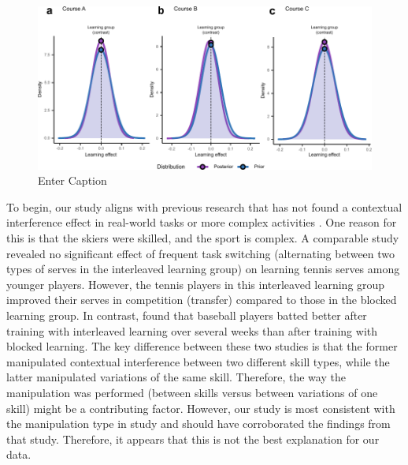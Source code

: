 \begin{figure}
    \centering
    \includegraphics[width=1\linewidth]{figure/figure_results_BF.pdf}
    \caption{Enter Caption}
    \label{fig:ci_bf}
\end{figure}

To begin, our study aligns with previous research that has not found a contextual interference effect in real-world tasks or more complex activities \cite{brady_theoretical_1998, barreiros_contextual_2007, wulf_principles_2002}. One reason for this is that the skiers were skilled, and the sport is complex. A comparable study revealed no significant effect of frequent task switching (alternating between two types of serves in the interleaved learning group) on learning tennis serves among younger players\cite{buszard_quantifying_2017}. However, the tennis players in this interleaved learning group improved their serves in competition (transfer) compared to those in the blocked learning group. In contrast, \cite{hall_contextual_1994} found that baseball players batted better after training with interleaved learning over several weeks than after training with blocked learning. The key difference between these two studies is that the former manipulated contextual interference between two different skill types, while the latter manipulated variations of the same skill. Therefore, the way the manipulation was performed (between skills versus between variations of one skill) might be a contributing factor. However, our study is most consistent with the manipulation type in \cite{hall_contextual_1994} study and should have corroborated the findings from that study. Therefore, it appears that this is not the best explanation for our data.

